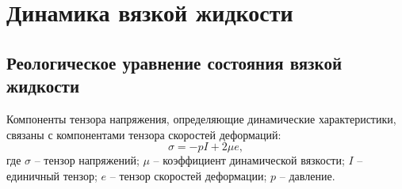\documentclass[14pt]{extarticle}
\begin{document}
\newpage

\section{Динамика вязкой жидкости}

\subsection{Реологическое уравнение состояния вязкой жидкости}

Компоненты тензора напряжения, определяющие динамические характеристики, связаны с компонентами тензора скоростей деформаций:
\begin{equation}
\label{eq:sigma_e_connection}
\sigma = -p I + 2 \mu e,
\end{equation}
где $\sigma$ -- тензор напряжений; $\mu$ -- коэффициент динамической вязкости; $I$ --  единичный тензор; $e$ -- тензор скоростей деформации;  $p$ -- давление.
\end{document}
